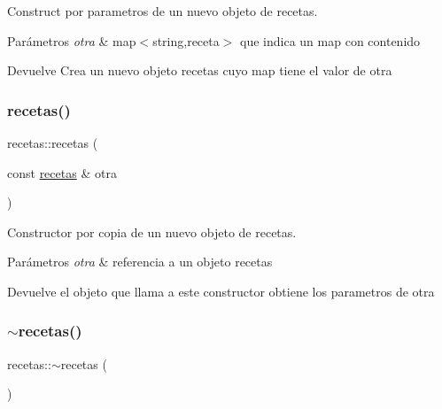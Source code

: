 Construct por parametros de un nuevo objeto de recetas. 


\begin{DoxyParams}{Parámetros}
{\em otra} & map$<$string,receta$>$ que indica un map con contenido \\
\hline
\end{DoxyParams}
\begin{DoxyReturn}{Devuelve}
Crea un nuevo objeto recetas cuyo map tiene el valor de otra 
\end{DoxyReturn}
\mbox{\label{classrecetas_a7e071e6d0aab97f7810c3c987b5b89cc}} 
\subsubsection{\texorpdfstring{recetas()}{recetas()}\hspace{0.1cm}{\footnotesize\ttfamily [3/3]}}
{\footnotesize\ttfamily recetas\+::recetas (\begin{DoxyParamCaption}\item[{const \hyperlink{classrecetas}{recetas} \&}]{otra }\end{DoxyParamCaption})}



Constructor por copia de un nuevo objeto de recetas. 


\begin{DoxyParams}{Parámetros}
{\em otra} & referencia a un objeto recetas \\
\hline
\end{DoxyParams}
\begin{DoxyReturn}{Devuelve}
el objeto que llama a este constructor obtiene los parametros de otra 
\end{DoxyReturn}
\mbox{\label{classrecetas_a2f1ebaeabb8cc344cb7af3667f99645c}} 
\subsubsection{\texorpdfstring{$\sim$recetas()}{~recetas()}}
{\footnotesize\ttfamily recetas\+::$\sim$recetas (\begin{DoxyParamCaption}{ }\end{DoxyParamCaption})}



